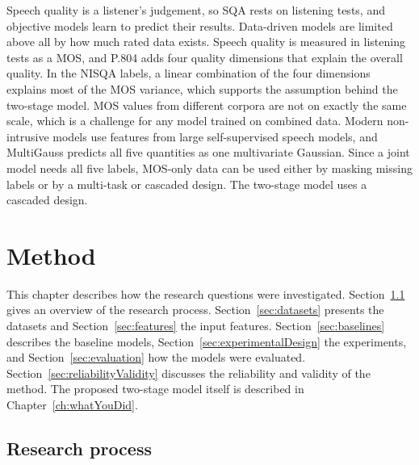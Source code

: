 \documentclass[
english,                 %
bibtex,                  %
includeExtraAbstracts, %
]{kththesis}
\numberwithin{listing}{chapter}
\begin{document}
Speech quality is a listener's judgement, so SQA rests on listening tests, and objective models learn to predict their results. Data-driven models are limited above all by how much rated data exists. Speech quality is measured in listening tests as a MOS, and P.804 adds four quality dimensions that explain the overall quality. In the NISQA labels, a linear combination of the four dimensions explains most of the MOS variance, which supports the assumption behind the two-stage model. MOS values from different corpora are not on exactly the same scale, which is a challenge for any model trained on combined data. Modern non-intrusive models use features from large self-supervised speech models, and MultiGauss predicts all five quantities as one multivariate Gaussian. Since a joint model needs all five labels, MOS-only data can be used either by masking missing labels or by a multi-task or cascaded design. The two-stage model uses a cascaded design.

\cleardoublepage
\chapter{Method}
\label{ch:methods}

This chapter describes how the research questions were investigated. Section~\ref{sec:researchProcess} gives an overview of the research process. Section~\ref{sec:datasets} presents the datasets and Section~\ref{sec:features} the input features. Section~\ref{sec:baselines} describes the baseline models, Section~\ref{sec:experimentalDesign} the experiments, and Section~\ref{sec:evaluation} how the models were evaluated. Section~\ref{sec:reliabilityValidity} discusses the reliability and validity of the method. The proposed two-stage model itself is described in Chapter~\ref{ch:whatYouDid}.

\section{Research process}
\label{sec:researchProcess}
\end{document}
